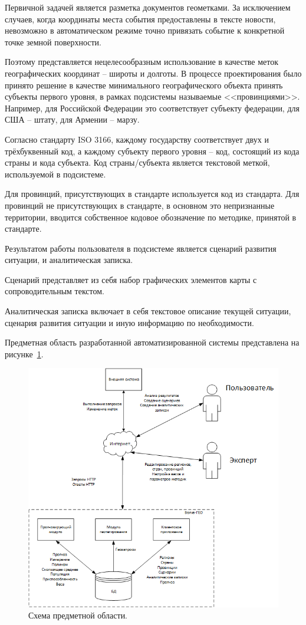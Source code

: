 Первичной задачей является разметка документов геометками. За исключением случаев, когда координаты места события предоставлены в тексте новости, невозможно в автоматическом режиме точно привязать событие к конкретной точке земной поверхности.

Поэтому представляется нецелесообразным использование в качестве меток географических координат -- широты и долготы. В процессе проектирования было принято решение в качестве минимального географического объекта принять субъекты первого уровня, в рамках подсистемы называемые <<провинциями>>. Например, для Российской Федерации это соответствует субъекту федерации, для США -- штату, для Армении -- марзу.

Согласно стандарту ISO 3166, каждому государству соответствует двух и трёхбуквенный код, а каждому субъекту первого уровня -- код, состоящий из кода страны и кода субъекта.
Код страны/субъекта является текстовой меткой, используемой в подсистеме.

Для провинций, присутствующих в стандарте используется код из стандарта. Для провинций не присутствующих в стандарте, в основном это непризнанные территории, вводится собственное кодовое обозначение по методике, принятой в стандарте.

Результатом работы пользователя в подсистеме является сценарий развития ситуации, и аналитическая записка.

Сценарий представляет из себя набор графических элементов карты с сопроводительным текстом.

Аналитическая записка включает в себя текстовое описание текущей ситуации, сценария развития ситуации и иную информацию по необходимости.

Предметная область разработанной автоматизированной системы представлена на
рисунке~\ref{figure:domain}.

\begin{figure}[!h]
\centering
\includegraphics{design/domain}
\caption{Схема предметной области.}
\label{figure:domain}
\end{figure}


